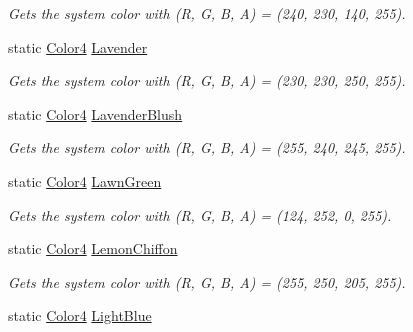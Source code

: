 \begin{DoxyCompactItemize}
\begin{DoxyCompactList}\small\item\em Gets the system color with (R, G, B, A) = (240, 230, 140, 255). \end{DoxyCompactList}\item 
static \hyperlink{struct_open_t_k_1_1_graphics_1_1_color4}{Color4} \hyperlink{struct_open_t_k_1_1_graphics_1_1_color4_ac68cc54c5a047d57d9f1da5ead050a54}{Lavender}
\begin{DoxyCompactList}\small\item\em Gets the system color with (R, G, B, A) = (230, 230, 250, 255). \end{DoxyCompactList}\item 
static \hyperlink{struct_open_t_k_1_1_graphics_1_1_color4}{Color4} \hyperlink{struct_open_t_k_1_1_graphics_1_1_color4_af4e24d824eebc33012123704043b4d48}{Lavender\-Blush}
\begin{DoxyCompactList}\small\item\em Gets the system color with (R, G, B, A) = (255, 240, 245, 255). \end{DoxyCompactList}\item 
static \hyperlink{struct_open_t_k_1_1_graphics_1_1_color4}{Color4} \hyperlink{struct_open_t_k_1_1_graphics_1_1_color4_a437c95c699bfdbb192b91ce31f04a01c}{Lawn\-Green}
\begin{DoxyCompactList}\small\item\em Gets the system color with (R, G, B, A) = (124, 252, 0, 255). \end{DoxyCompactList}\item 
static \hyperlink{struct_open_t_k_1_1_graphics_1_1_color4}{Color4} \hyperlink{struct_open_t_k_1_1_graphics_1_1_color4_ab7c02e7e9f45bdecb19a14715c92ae61}{Lemon\-Chiffon}
\begin{DoxyCompactList}\small\item\em Gets the system color with (R, G, B, A) = (255, 250, 205, 255). \end{DoxyCompactList}\item 
static \hyperlink{struct_open_t_k_1_1_graphics_1_1_color4}{Color4} \hyperlink{struct_open_t_k_1_1_graphics_1_1_color4_abcb61e9015feb7abd0b61e054d037f07}{Light\-Blue}

\end{DoxyCompactItemize}
